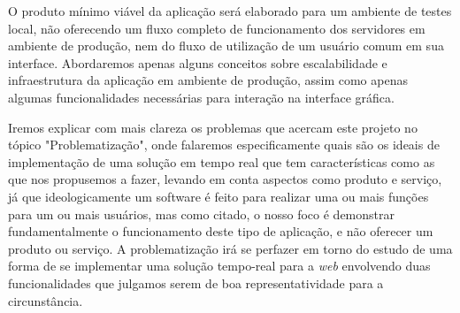 O produto mínimo viável da aplicação será elaborado para um ambiente de testes local, não oferecendo um fluxo completo de funcionamento dos servidores em ambiente de produção, nem do fluxo de utilização de um usuário comum em sua interface. Abordaremos apenas alguns conceitos sobre escalabilidade e infraestrutura da aplicação em ambiente de produção, assim como apenas algumas funcionalidades necessárias para interação na interface gráfica.

Iremos explicar com mais clareza os problemas que acercam este projeto no tópico "Problematização", onde falaremos especificamente quais são os ideais de implementação de uma solução em tempo real que tem características como as que nos propusemos a fazer, levando em conta aspectos como produto e serviço, já que ideologicamente um software é feito para realizar uma ou mais funções para um ou mais usuários, mas como citado, o nosso foco é demonstrar fundamentalmente o funcionamento deste tipo de aplicação, e não oferecer um produto ou serviço. A problematização irá se perfazer em torno do estudo de uma forma de se implementar uma solução tempo-real para a \textit{web} envolvendo duas funcionalidades que julgamos serem de boa representatividade para a circunstância.
